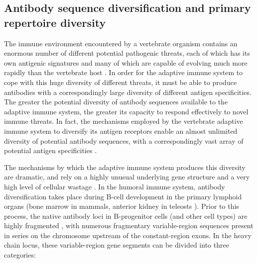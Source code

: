 \begin{figure}
\label{fig:intro-antibody-structure}
\end{figure}

\subsection{Antibody sequence diversification and primary repertoire diversity}
\label{sec:intro_immunity_primary}

The immune environment encountered by a vertebrate organism contains an enormous number of different potential pathogenic threats, each of which has its own antigenic signatures and many of which are capable of evolving much more rapidly than the vertebrate host \parencite{jack2015evolution}. In order for the adaptive immune system to cope with this huge diversity of different threats, it must be able to produce antibodies with a correspondingly large diversity of different antigen specificities. The greater the potential diversity of antibody sequences available to the adaptive immune system, the greater its capacity to respond effectively to novel immune threats. In fact, the mechanisms employed by the vertebrate adaptive immune system to diversify its antigen receptors enable an almost unlimited diversity of potential antibody sequences, with a correspondingly vast array of potential antigen specificities \parencite{mora2016diversity}.

The mechanisms by which the adaptive immune system produces this diversity are dramatic, and rely on a highly unusual underlying gene structure \parencite{jung2006vdjr} and a very high level of cellular wastage \parencite{kogut2012bcells}. In the humoral immune system, antibody diversification takes place during B-cell development in the primary lymphoid organs (bone marrow in mammals, anterior kidney in teleosts \parencite{sunyer2013fishing}). Prior to this process, the native antibody loci in B-progenitor cells (and other cell types) are highly fragmented \parencite{jung2006vdjr}, with numerous fragmentary variable-region sequences present in series on the chromosome upstream of the constant-region exons. In the heavy chain locus, these variable-region gene segments can be divided into three categories:

